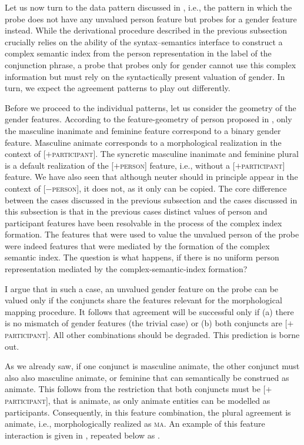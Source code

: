 \documentclass[output=paper,
modfonts
newtxmath,
hidelinks
]{langscibook}
\begin{document}
Let us now turn to the data pattern discussed in , i.e., the pattern in which the probe does not have any unvalued person feature but probes for a gender feature instead. While the derivational procedure described in the previous subsection crucially relies on the ability of the syntax--semantics interface to construct a complex semantic index from the person representation in the label of the conjunction phrase, a probe that probes only for gender cannot use this complex information but must rely on the syntactically present valuation of gender. In turn, we expect the agreement patterns to play out differently. 

Before we proceed to the individual patterns, let us consider the geometry of the gender features. According to the feature-geometry of person proposed in , only the masculine inanimate and feminine feature correspond to a binary gender feature. Masculine animate corresponds to a morphological realization in the context of [$+$\textsc{participant}]. The syncretic masculine inanimate and feminine plural is a default realization of the [$+$\textsc{person}] feature, i.e., without a  [$+$\textsc{participant}] feature. We have also seen that although neuter should in principle appear in the context of [$-$\textsc{person}], it does not, as it only can be copied. The core difference between the cases discussed in the previous subsection and the cases discussed in this subsection is that in the previous cases distinct values of person and participant features have been resolvable in the process of the complex index formation. The features that were used to value the unvalued person of the probe were indeed features that were mediated by the formation of the complex semantic index. The question is what happens, if there is no uniform person representation mediated by the complex-semantic-index formation?

I argue that in such a case, an unvalued gender feature on the probe can be valued only if the conjuncts share the features relevant for the morphological mapping procedure. It follows that agreement will be successful only if (a) there is no mismatch of gender features (the trivial case) or (b) both conjuncts are [$+$\textsc{participant}]. All other combinations should be degraded. This prediction is borne out.

As we already saw, if one conjunct is masculine animate, the other conjunct must also also masculine animate, or feminine  that can semantically be construed as animate. This follows from the restriction that both conjuncts must be [$+$\textsc{participant}], that is animate, as only animate entities can be modelled as participants. Consequently, in this feature combination, the plural agreement is animate, i.e., morphologically realized as \textsc{ma}. An example of this feature interaction is given in , repeated below as .
\end{document}
